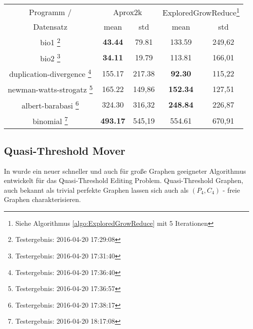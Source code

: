 \documentclass[12pt,a4paper,onecolumn,oneside,titlepage]{article}
\begin{document}
\begin{center}
\label{tab:size_2k}
\begin{tabular}{|c|c c|c c|}

\hline 
Programm / & \multicolumn{2}{c|}{Aprox2k} & \multicolumn{2}{c|}{ExploredGrowReduce\footnote{Siehe Algorithmus \ref{algo:ExploredGrowReduce} mit 5 Iterationen }} \\ 
Datensatz & \multicolumn{1}{c}{mean}  &  \multicolumn{1}{c|}{std} &  \multicolumn{1}{c}{mean} &  \multicolumn{1}{c|}{std} \\ 
\hline 
bio1 \footnote{Testergebnis: 2016-04-20 17:29:08} & \textbf{43.44}  & 79.81 & 133.59 & 249,62 \\ 
bio2 \footnote{Testergebnis: 2016-04-20 17:31:40} & \textbf{34.11} & 19.79 & 113.81 & 166,01 \\ 
duplication-divergence \footnote{Testergebnis: 2016-04-20 17:36:40} & 155.17 & 217.38 & \textbf{92.30} & 115,22 \\ 
newman-watts-strogatz \footnote{Testergebnis: 2016-04-20 17:36:57} & 165.22 & 149,86 & \textbf{152.34} & 127,51 \\ 
albert-barabasi \footnote{Testergebnis: 2016-04-20 17:38:17} & 324.30 & 316,32 & \textbf{248.84} & 226,87 \\ 
binomial \footnote{Testergebnis: 2016-04-20 18:17:08} & \textbf{493.17} & 545,19 & 554.61 & 670,91 \\ 
 
\hline 
\end{tabular} 
\end{center}


\subsection{Quasi-Threshold Mover}
In \cite{BrandesHSW15} wurde ein neuer schneller und auch für große Graphen geeigneter Algorithmus entwickelt für das Quasi-Threshold Editing Problem. Quasi-Threshold Graphen, auch bekannt als trivial perfekte Graphen lassen sich auch als $(P_4, C_4)$ - freie Graphen charakterisieren. 
\end{document}
